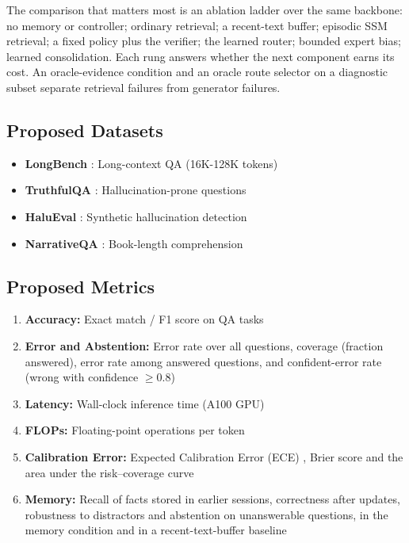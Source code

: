 \documentclass{article}
\begin{document}
The comparison that matters most is an ablation ladder over the same backbone: no memory or controller; ordinary retrieval; a recent-text buffer; episodic SSM retrieval; a fixed policy plus the verifier; the learned router; bounded expert bias; learned consolidation. Each rung answers whether the next component earns its cost. An oracle-evidence condition and an oracle route selector on a diagnostic subset separate retrieval failures from generator failures.

\subsection{Proposed Datasets}

\begin{itemize}
    \item \textbf{LongBench} \cite{bai2023longbench}: Long-context QA (16K-128K tokens)
    \item \textbf{TruthfulQA} \cite{lin2022truthfulqa}: Hallucination-prone questions
    \item \textbf{HaluEval} \cite{li2023halueval}: Synthetic hallucination detection
    \item \textbf{NarrativeQA} \cite{kocisky2018narrativeqa}: Book-length comprehension
\end{itemize}

\subsection{Proposed Metrics}

\begin{enumerate}
    \item \textbf{Accuracy:} Exact match / F1 score on QA tasks
    \item \textbf{Error and Abstention:} Error rate over all questions, coverage (fraction answered), error rate among answered questions, and confident-error rate (wrong with confidence $\geq 0.8$)
    \item \textbf{Latency:} Wall-clock inference time (A100 GPU)
    \item \textbf{FLOPs:} Floating-point operations per token
    \item \textbf{Calibration Error:} Expected Calibration Error (ECE) \cite{guo2017calibration}, Brier score and the area under the risk--coverage curve
    \item \textbf{Memory:} Recall of facts stored in earlier sessions, correctness after updates, robustness to distractors and abstention on unanswerable questions, in the memory condition and in a recent-text-buffer baseline
\end{enumerate}
\end{document}
